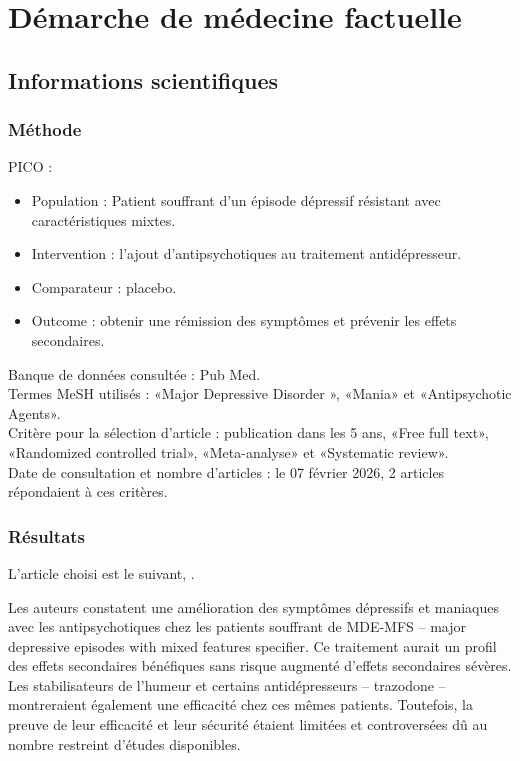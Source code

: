 \section{Démarche de médecine factuelle}

\subsection{Informations scientifiques}
  
\subsubsection{Méthode}

PICO :
\begin{itemize}[compact, label=\textbullet]
    \item Population : Patient souffrant d’un épisode dépressif résistant avec caractéristiques mixtes. 
    \item Intervention : l’ajout d’antipsychotiques au traitement antidépresseur. 
    \item Comparateur : placebo. 
    \item Outcome : obtenir une rémission des symptômes et prévenir les effets secondaires. 
\end{itemize}

Banque de données consultée : Pub Med.\\ 
Termes MeSH utilisés : «Major Depressive Disorder », «Mania» et «Antipsychotic Agents».\\
Critère pour la sélection d’article : publication dans les 5 ans, «Free full text», «Randomized controlled trial», «Meta-analyse» et «Systematic review».\\
Date de consultation et nombre d’articles : le 07 février 2026, 2 articles répondaient à ces critères. 

\subsubsection{Résultats}  

L'article choisi est le suivant, \textcite{gao2025efficacy}.
 
Les auteurs constatent une amélioration des symptômes dépressifs et maniaques avec les antipsychotiques chez les patients souffrant de MDE-MFS -- major depressive episodes with mixed features specifier. Ce traitement aurait un profil des effets secondaires bénéfiques sans risque augmenté d’effets secondaires sévères. Les stabilisateurs de l’humeur et certains antidépresseurs -- trazodone -- montreraient également une efficacité chez ces mêmes patients. Toutefois, la preuve de leur efficacité et leur sécurité étaient limitées et controversées dû au nombre restreint d’études disponibles.

